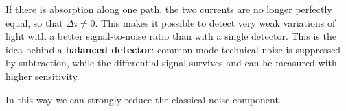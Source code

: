 If there is absorption along one path, the two currents are no longer perfectly equal, so that $\Delta i \neq 0$. This makes it possible to detect very weak variations of light with a better signal-to-noise ratio than with a single detector. This is the idea behind a \textbf{balanced detector}: common-mode technical noise is suppressed by subtraction, while the differential signal survives and can be measured with higher sensitivity.

In this way we can strongly reduce the classical noise component. 
